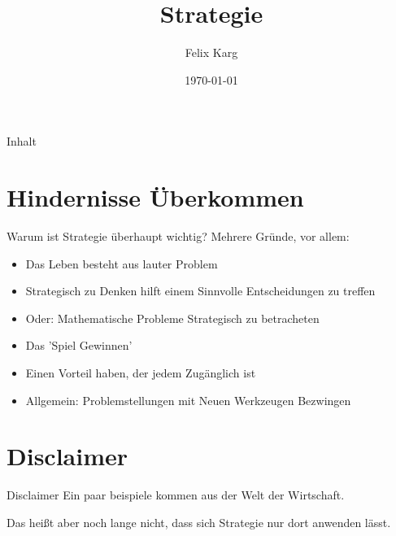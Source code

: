 \documentclass[12pt,compress,ngerman,utf8,t]{beamer}
\date{\today}
\institute{University of Freiburg}
\title{Strategie}
\author{Felix Karg}
\begin{document}
\maketitle


\begin{frame}{Inhalt}
    \begin{multicols}{2}
        \small
        \tableofcontents[hidesubsections]
    \end{multicols}
    \clearpage
\end{frame}



\section{Hindernisse Überkommen}

\begin{frame}[c]{Warum ist Strategie überhaupt wichtig?}
    Mehrere Gründe, vor allem: \\
    \pause
    \begin{itemize}
        \item Das Leben besteht aus lauter Problem
            \pause
        \item Strategisch zu Denken hilft einem Sinnvolle Entscheidungen zu treffen
            \pause
        \item Oder: Mathematische Probleme Strategisch zu betracheten
            \pause
        \item Das 'Spiel Gewinnen'
            \pause
        \item Einen Vorteil haben, der jedem Zugänglich ist
            \pause
        \item Allgemein: Problemstellungen mit Neuen Werkzeugen Bezwingen
    \end{itemize}
\end{frame}


\section{Disclaimer}
\begin{frame}[c]{Disclaimer}
    Ein paar beispiele kommen aus der Welt der Wirtschaft. \\ \pause

    \vfill

    Das heißt aber noch lange nicht, dass sich Strategie nur dort anwenden lässt.
\end{frame}
\end{document}
